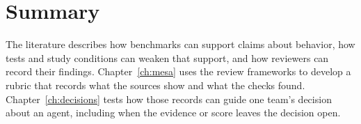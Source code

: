 \section{Summary}
\label{sec:bg_summary}

The literature describes how benchmarks can support claims about behavior, how tests and study conditions can weaken that support, and how reviewers can record their findings. Chapter~\ref{ch:mesa} uses the review frameworks to develop a rubric that records what the sources show and what the checks found. Chapter~\ref{ch:decisions} tests how those records can guide one team's decision about an agent, including when the evidence or score leaves the decision open.
